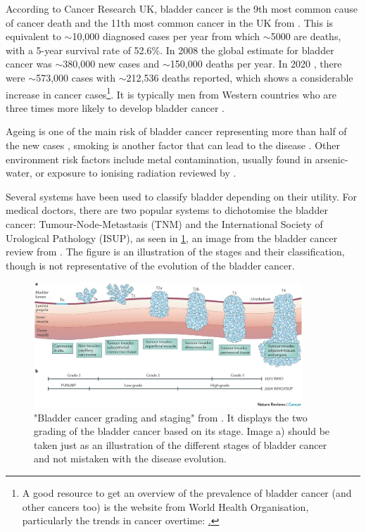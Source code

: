 According to Cancer Research UK, bladder cancer is the 9th most common cause of cancer death and the 11th most common cancer in the UK from \citet{Cancer_Research_UK2015-cf}. This is equivalent to $\sim$10,000 diagnosed cases per year from which  $\sim$5000 are deaths, with a 5-year survival rate of 52.6\%. In 2008 \citep{Ferlay2010-sx} the global estimate for bladder cancer was $\sim$380,000 new cases and $\sim$150,000 deaths per year. In 2020 \citep{Sung2021-hn}, there were $\sim$573,000 cases with $\sim$212,536 deaths reported, which shows a considerable increase in cancer cases\footnote{A good resource to get an overview of the prevalence of bladder cancer (and other cancers too) is the website from World Health Organisation, particularly the trends in cancer overtime: \href{https://gco.iarc.fr/en}.}. It is typically men from Western countries who are three times more likely to develop bladder cancer \citet{Knowles2015-mu}. 

Ageing is one of the main risk of bladder cancer representing more than half of the new cases \cite{Cancer_Research_UK2015-cf}, smoking is another factor that can lead to the disease \citep{Knowles2015-mu}. Other environment risk factors include metal contamination, usually found in arsenic-water, or exposure to ionising radiation reviewed by \citep{Knowles2015-mu}. 

Several systems have been used to classify bladder depending on their utility. For medical doctors, there are two popular systems to dichotomise the bladder cancer: Tumour-Node-Metastasis (TNM) and the International Society of Urological Pathology (ISUP), as seen in \cref{fig:lit:bladder_cancer_stages}, an image from the bladder cancer review from \citet{Knowles2015-mu}. The figure is an illustration of the stages and their classification, though is not representative of the evolution of the bladder cancer.

\begin{figure}[!t]    
    \centering
\includegraphics[width=0.9\textwidth,height=0.9\textheight,keepaspectratio]{Sections/Lit_review/Resources/bladder_cancer_grading.jpg}
    \caption{"Bladder cancer grading and staging" from \cite{Knowles2015-mu}. It displays the two grading of the bladder cancer based on its stage. Image a) should be taken just as an illustration of the different stages of bladder cancer and not mistaken with the disease evolution. }
    \label{fig:lit:bladder_cancer_stages}
\end{figure}


